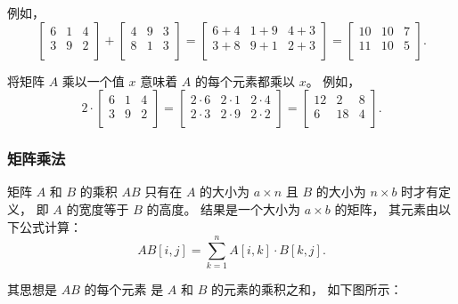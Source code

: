 例如，
\[
 \begin{bmatrix}
  6 & 1 & 4 \\
  3 & 9 & 2 \\
 \end{bmatrix}
+
 \begin{bmatrix}
  4 & 9 & 3 \\
  8 & 1 & 3 \\
 \end{bmatrix}
=
 \begin{bmatrix}
  6+4 & 1+9 & 4+3 \\
  3+8 & 9+1 & 2+3 \\
 \end{bmatrix}
=
 \begin{bmatrix}
  10 & 10 & 7 \\
  11 & 10 & 5 \\
 \end{bmatrix}.
\]

将矩阵 $A$ 乘以一个值 $x$ 意味着
$A$ 的每个元素都乘以 $x$。
例如，
\[
 2 \cdot \begin{bmatrix}
  6 & 1 & 4 \\
  3 & 9 & 2 \\
 \end{bmatrix}
=
 \begin{bmatrix}
  2 \cdot 6 & 2\cdot1 & 2\cdot4 \\
  2\cdot3 & 2\cdot9 & 2\cdot2 \\
 \end{bmatrix}
=
 \begin{bmatrix}
  12 & 2 & 8 \\
  6 & 18 & 4 \\
 \end{bmatrix}.
\]

\subsubsection{矩阵乘法}


矩阵 $A$ 和 $B$ 的乘积 $AB$ 只有在
$A$ 的大小为 $a \times n$ 且
$B$ 的大小为 $n \times b$ 时才有定义，
即 $A$ 的宽度等于 $B$ 的高度。
结果是一个大小为 $a \times b$ 的矩阵，
其元素由以下公式计算：
\[
AB[i,j] = \sum_{k=1}^n A[i,k] \cdot B[k,j].
\]

其思想是 $AB$ 的每个元素
是 $A$ 和 $B$ 的元素的乘积之和，
如下图所示：

\begin{center}
\end{center}

